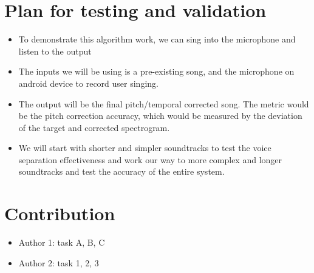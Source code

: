 \documentclass[journal,onecolumn, draftclsnofoot, 12pt]{IEEEtran}
\begin{document}
\section{Plan for testing and validation}
\begin{itemize}
    \item To demonstrate this algorithm work, we can sing into the microphone and listen to the output
    \item The inputs we will be using is a pre-existing song, and the microphone on android device to record user singing. 
    \item The output will be the final pitch/temporal corrected song. The metric would be the pitch correction accuracy, which would be measured by the deviation of the target and corrected spectrogram.
    \item We will start with shorter and simpler soundtracks to test the voice separation effectiveness and work our way to more complex and longer soundtracks and test the accuracy of the entire system.
    
\end{itemize}

\section{Contribution}
\begin{itemize}
    \item Author 1: task A, B, C
    \item Author 2: task 1, 2, 3
\end{itemize}



 


\end{document}
